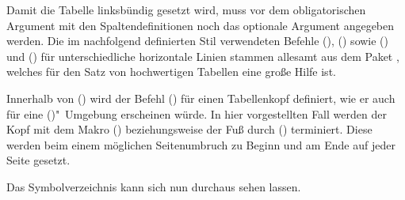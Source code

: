 \documentclass[%
  english,ngerman,%
  cdgeometry=no,DIV=12,%
  automark,%
  listof=toc,%
]{tudscrartcl}
\begin{document}
Damit die Tabelle linksbündig gesetzt wird, muss vor dem obligatorischen 
Argument mit den Spaltendefinitionen noch das optionale Argument  
angegeben werden. Die im nachfolgend definierten Stil verwendeten Befehle  
(), () sowie
() und () 
für unterschiedliche horizontale Linien stammen allesamt aus dem Paket 
, welches für den Satz von hochwertigen Tabellen eine große 
Hilfe ist.
%
\CodeHook{\let\newglossarystyle\renewglossarystyle}
\begin{Preamble*}
\end{Preamble*}
%
Innerhalb von () wird der Befehl 
() für einen Tabellenkopf definiert, 
wie er auch für eine ()"~Umgebung 
erscheinen würde. In hier vorgestellten Fall werden der Kopf mit dem Makro 
() beziehungsweise der Fuß durch 
() terminiert. Diese werden beim 
einem möglichen Seitenumbruch zu Beginn und am Ende auf jeder Seite gesetzt.
%
\begin{Preamble+}
}%

\end{Preamble+}
%
Das Symbolverzeichnis kann sich nun durchaus sehen lassen.
%
\begin{Hint}
\printsymbols[style=symblongtabu]
\end{Hint}
\begin{quoting}[rightmargin=0pt]
\printsymbols[style=symbtabu]
\end{quoting}
\end{document}
